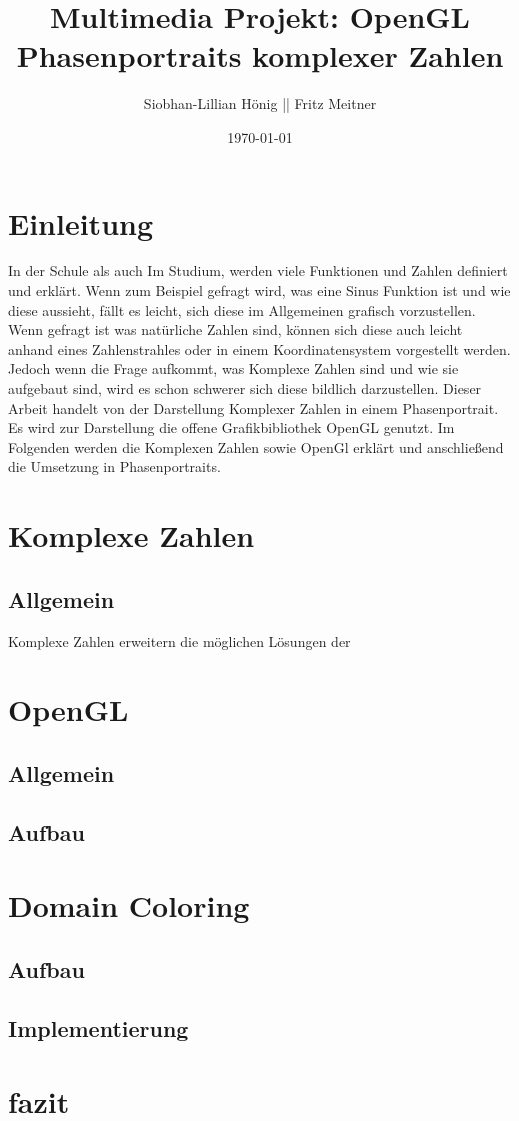 \documentclass[11pt]{article}
\title{\textbf{Multimedia Projekt: OpenGL Phasenportraits komplexer Zahlen}}
\author{Siobhan-Lillian Hönig || Fritz Meitner}
\date{\today}
\begin{document}
    
\begin{titlepage}
    \maketitle
\end{titlepage}
\pagebreak

\pagebreak
\tableofcontents
\pagebreak


\glsaddall
\printglossary[title=Special terms, toctitle=List of terms]
\pagebreak

\section{Einleitung}
In der Schule als auch Im Studium, werden viele Funktionen und Zahlen definiert und erklärt. 
Wenn zum Beispiel gefragt wird, was eine Sinus Funktion ist und wie diese aussieht, fällt es leicht, sich diese im Allgemeinen grafisch vorzustellen. 
Wenn gefragt ist was natürliche Zahlen sind, können sich diese auch leicht anhand eines Zahlenstrahles oder in einem Koordinatensystem vorgestellt werden. 
Jedoch wenn die Frage aufkommt, was  Komplexe Zahlen sind und wie sie aufgebaut sind, wird es schon schwerer sich diese bildlich darzustellen.
Dieser Arbeit handelt von der Darstellung Komplexer Zahlen in einem Phasenportrait. Es wird zur Darstellung die offene Grafikbibliothek OpenGL genutzt.  
Im Folgenden werden die Komplexen Zahlen sowie OpenGl erklärt und anschließend die Umsetzung in Phasenportraits. 


\section{Komplexe Zahlen} \label{Com}
\subsection{Allgemein}
Komplexe Zahlen erweitern die möglichen Lösungen der 

\section{OpenGL} \label{GL}
\subsection{Allgemein}

\subsection{Aufbau}

\section{Domain Coloring}

\subsection{Aufbau}
\subsection{Implementierung}

\section{fazit}

\pagebreak



\end{document}
